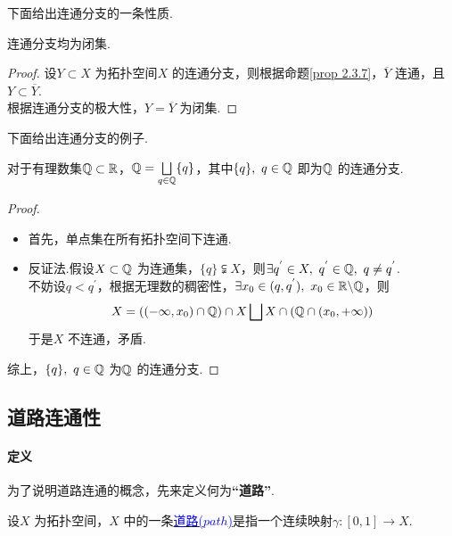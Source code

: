\newpage
	下面给出连通分支的一条性质.
	\begin{proposition}\label{2.3.9}
		连通分支均为闭集.
		
		\vspace*{2em}
		\begin{proof}
			设$Y \subset X$ 为拓扑空间$X$ 的连通分支，则根据命题\ref{prop 2.3.7}，$\overline{Y}$ 连通，且$Y \subset \overline{Y}$.\\
			根据连通分支的极大性，$Y = \overline{Y}$ 为闭集.
		\end{proof}
	\end{proposition}

	\vspace*{2em}
	下面给出连通分支的例子.
	\begin{example}\label{ex 2.3.7}
		对于有理数集$\mathbb{Q} \subset \mathbb{R}$，$\mathbb{Q} = \underset{q \in \mathbb{Q}}{\bigsqcup}{\{ q \}}$，其中$\{ q \} , \,\, q \in \mathbb{Q}$ 即为$\mathbb{Q}$ 的连通分支.
		
		\vspace*{2em}
		\begin{proof}
			\begin{itemize}
				\item 首先，单点集在所有拓扑空间下连通.
				
				\item 反证法.假设$X \subset \mathbb{Q}$ 为连通集，$\{ q \} \subsetneqq X$，则$\exists q^{'} \in X , \,\, q^{'} \in \mathbb{Q} , \,\, q \neq q^{'}$.\\
				不妨设$q < q^{'}$，根据无理数的稠密性，$\exists x_0 \in (q , q^{'}) , \,\, x_0 \in \mathbb{R} \backslash \mathbb{Q}$，则
				\begin{align}
					X = \left( (-\infty , x_0) \cap \mathbb{Q} \right) \cap X \bigsqcup X \cap \left( \mathbb{Q} \cap (x_0 , +\infty) \right)
				\end{align}
				于是$X$ 不连通，矛盾.
			\end{itemize}
			综上，$\{ q \} , \,\, q \in \mathbb{Q}$ 为$\mathbb{Q}$ 的连通分支.
		\end{proof}
	\end{example}

\newpage
\subsection{道路连通性}
\paragraph{定义}
	为了说明道路连通的概念，先来定义何为\textbf{“道路”}.
	\begin{defn}\label{def 2.3.5}
		设$X$ 为拓扑空间，$X$ 中的一条\underline{\textcolor{blue}{道路($path$)}}是指一个连续映射$\gamma : [0 , 1] \longrightarrow X$.
	\end{defn}
	
